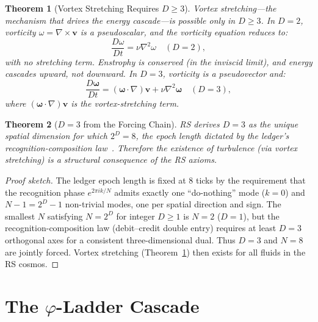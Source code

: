 \documentclass[12pt,a4paper]{article}
\newtheorem{theorem}{Theorem}[section]
\theoremstyle{definition}
\theoremstyle{remark}
\begin{document}
\begin{theorem}[Vortex Stretching Requires $D \geq 3$]
\label{thm:vortex}
Vortex stretching---the mechanism that drives the energy
cascade---is possible only in $D \geq 3$.  In $D = 2$,
vorticity $\omega = \nabla \times \mathbf{v}$ is a
pseudoscalar, and the vorticity equation reduces to:
\begin{equation}
  \frac{D\omega}{Dt} = \nu\nabla^2\omega
  \quad (D = 2),
\end{equation}
with no stretching term.  Enstrophy is conserved (in the inviscid
limit), and energy cascades \emph{upward}, not downward.  In
$D = 3$, vorticity is a pseudovector and:
\begin{equation}
  \frac{D\boldsymbol{\omega}}{Dt}
  = (\boldsymbol{\omega} \cdot \nabla)\mathbf{v}
  + \nu\nabla^2\boldsymbol{\omega}
  \quad (D = 3),
\end{equation}
where $(\boldsymbol{\omega} \cdot \nabla)\mathbf{v}$ is the
vortex-stretching term.
\end{theorem}

\begin{theorem}[$D = 3$ from the Forcing Chain]
\label{thm:d3-forced}
RS derives $D = 3$ as the unique spatial dimension for which
$2^D = 8$, the epoch length dictated by the ledger's
recognition-composition law~\cite{RS_Axioms}.  Therefore the
existence of turbulence (via vortex stretching) is a structural
consequence of the RS axioms.
\end{theorem}

\begin{proof}[Proof sketch]
The ledger epoch length is fixed at 8 ticks by the requirement
that the recognition phase $e^{2\pi i k/N}$ admits exactly one
``do-nothing'' mode ($k = 0$) and $N - 1 = 2^D - 1$ non-trivial
modes, one per spatial direction and sign.  The smallest $N$
satisfying $N = 2^D$ for integer $D \geq 1$ is $N = 2$ ($D = 1$),
but the recognition-composition law (debit--credit double entry)
requires at least $D = 3$ orthogonal axes for a consistent
three-dimensional dual.  Thus $D = 3$ and $N = 8$ are jointly
forced.  Vortex stretching (Theorem~\ref{thm:vortex}) then exists
for all fluids in the RS cosmos.
\end{proof}

\section{The $\varphi$-Ladder Cascade}
\label{sec:cascade}
\end{document}
